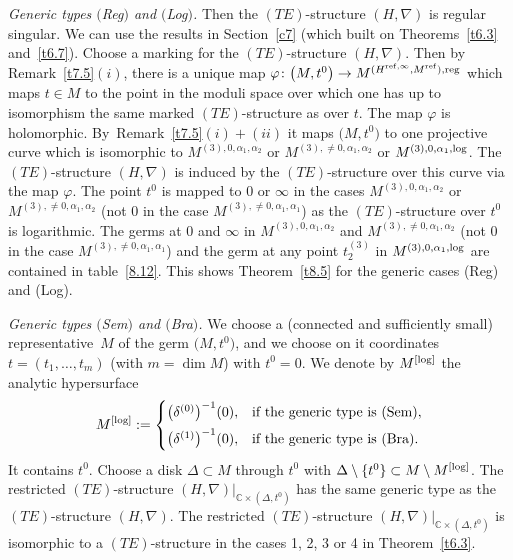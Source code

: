 \documentclass[10pt,a4paper]{amsart}
\numberwithin{equation}{section}
\numberwithin{figure}{section}
\newcommand{\C}{{\mathbb C}}
\newcommand{\nnn}{\nabla}
\begin{document}
\medskip\noindent
{\it Generic types $($Reg$)$ and $($Log$)$.}
Then the $(TE)$-structure $(H,\nnn)$ is regular singular.
We can use the results in Section~\ref{c7}
(which built on Theorems~\ref{t6.3} and~\ref{t6.7}).
Choose a marking for the $(TE)$-structure $(H,\nnn)$.
Then by Remark~\ref{t7.5}$(i)$, there is a unique map
$\varphi\colon \big(M,t^0\big)\to M^{(H^{{\rm ref},\infty},M^{\rm ref}),{\rm reg}}$
which maps $t\in M$ to the point in the moduli space
over which one has up to isomorphism the same
marked $(TE)$-structure as over $t$. The map
$\varphi$ is holomorphic. By~Re\-mark~\ref{t7.5}$(i){+}(ii)$
it maps $\big(M,t^0\big)$ to one projective curve
which is isomorphic to
$M^{(3),0,\alpha_1,\alpha_2}$ or
$M^{(3),\neq 0,\alpha_1,\alpha_2}$ or
$M^{(3),0,\alpha_1,{\rm log}}$.
The $(TE)$-structure $(H,\nnn)$ is induced by the
$(TE)$-structure over this curve via the map $\varphi$.
The point $t^0$ is mapped to $0$ or $\infty$ in the
cases $M^{(3),0,\alpha_1,\alpha_2}$ or~$M^{(3),\neq 0,\alpha_1,\alpha_2}$
\big(not 0 in the case $M^{(3),\neq 0,\alpha_1,\alpha_1}$\big)
as the $(TE)$-structure over $t^0$ is logarithmic.
The germs at $0$ and $\infty$ in
$M^{(3),0,\alpha_1,\alpha_2}$ and
$M^{(3),\neq 0,\alpha_1,\alpha_2}$
\big(not 0 in the case $M^{(3),\neq 0,\alpha_1,\alpha_1}$\big)
and the germ at any point $t_2^{(3)}$ in
$M^{(3),0,\alpha_1,{\rm log}}$ are contained in table~\eqref{8.12}.
This shows Theorem~\ref{t8.5} for the generic
cases (Reg) and (Log).

\medskip\noindent
{\it Generic types $($Sem$)$ and $($Bra$)$.}
We choose a (connected and sufficiently small)
representative~$M$ of the germ
$\big(M,t^0\big)$, and we choose on it coordinates
$t=(t_1,\dots ,t_m)$ (with $m=\dim M$) with $t^0=0$.
We denote by $M^{\rm [log]}$ the analytic hypersurface
\begin{gather*}%
M^{\rm [log]}:=\begin{cases}
\big(\delta^{(0)}\big)^{-1}(0),&\text{if the generic type is (Sem)},
\\[1ex]
\big(\delta^{(1)}\big)^{-1}(0),&\text{if the generic type is (Bra)}.
\end{cases}
\end{gather*}
It contains $t^0$.
Choose a disk $\Delta\subset M$ through $t^0$ with
$\Delta\setminus \{t^0\}\subset M\setminus M^{\rm [log]}$.
The restricted $(TE)$-structure
$(H,\nnn)|_{\C\times(\Delta,t^0)}$ has the same
generic type as the $(TE)$-structure $(H,\nnn)$.
The restricted $(TE)$-structure
$(H,\nnn)|_{\C\times(\Delta,t^0)}$
is isomorphic to a $(TE)$-structure in the cases
1, 2, 3 or 4 in Theorem~\ref{t6.3}.
\end{document}

